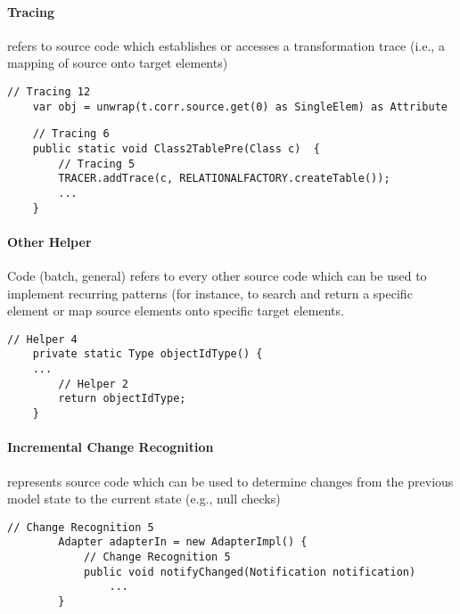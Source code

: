 \documentclass{article}
\begin{document}
    \paragraph{Tracing} refers to source code which establishes or accesses a transformation trace (i.e., a mapping of source onto target elements) \\
    \begin{lstlisting}[style=modernJava]
    // Tracing 12
    var obj = unwrap(t.corr.source.get(0) as SingleElem) as Attribute
    \end{lstlisting}

    \begin{lstlisting}
    // Tracing 6
    public static void Class2TablePre(Class c)  {
        // Tracing 5
        TRACER.addTrace(c, RELATIONALFACTORY.createTable());
        ...
    }
    \end{lstlisting}
    \paragraph{Other Helper} Code (batch, general) refers to every other source code which can be used to implement recurring patterns (for instance, to search and return a specific element or map source elements onto specific target elements. \\
        
     \begin{lstlisting}[style=modernJava]
    // Helper 4
    private static Type objectIdType() {
    ...
        // Helper 2
        return objectIdType;
    }
    \end{lstlisting}
\paragraph{{Incremental Change Recognition}} represents source code which can be used to determine changes from the previous model state to the current state (e.g., null checks)\\ 
        
        \begin{lstlisting}[style=modernJava]
        // Change Recognition 5
        Adapter adapterIn = new AdapterImpl() {
            // Change Recognition 5
            public void notifyChanged(Notification notification) 
                ...
        }
        \end{lstlisting}
\end{document}
